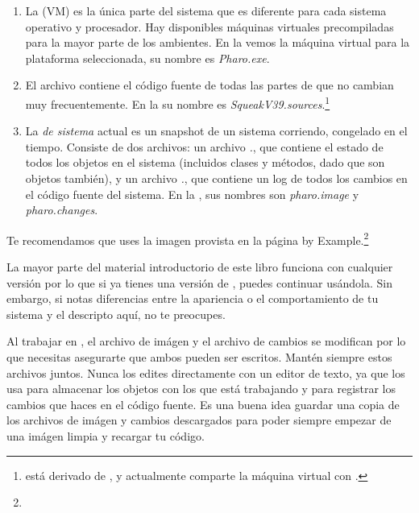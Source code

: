 \documentclass[a4paper,10pt,twoside]{book}
\begin{document}
\begin{enumerate}

  \item La  (VM) es la única parte del sistema que es diferente para cada sistema operativo y procesador. Hay disponibles máquinas virtuales precompiladas para la mayor parte de los ambientes. En la  vemos la máquina virtual para la plataforma seleccionada, su nombre es \textit{Pharo.exe}.

  \item El archivo  contiene el código fuente de todas las partes de \pharo que no cambian muy frecuentemente. En la  su nombre es \emph{SqueakV39.sources}.\footnote{\pharo está derivado de , y actualmente comparte la máquina virtual con \squeak.}

  \item La \emph{ de sistema} actual es un snapshot de un sistema \pharo corriendo, congelado en el tiempo. Consiste de dos archivos: un archivo  \emph{.}, que contiene el estado de todos los objetos en el sistema (incluidos clases y métodos, dado que son objetos también), y un archivo \emph{.}, que contiene un log de todos los cambios en el código fuente del sistema.
En la , sus nombres son \emph{pharo.image} y \emph{pharo.changes}.
\end{enumerate}

Te recomendamos que uses la imagen provista en la página \pharo by Example.\footnote{\pbe}

La mayor parte del material introductorio de este libro funciona con cualquier versión por lo que si ya tienes una versión de \pharo, puedes continuar usándola.
Sin embargo, si notas diferencias entre la apariencia o el comportamiento de tu sistema y el descripto aquí, no te preocupes.

Al trabajar en \pharo, el archivo de im\'agen y el archivo de cambios se modifican por lo que necesitas asegurarte que ambos pueden ser escritos.
Mant\'en siempre estos archivos juntos.
Nunca los edites directamente con un editor de texto, ya que \pharo los usa para almacenar los objetos con los que est\'a trabajando y para registrar los cambios que haces en el c\'odigo fuente.
Es una buena idea guardar una copia de los archivos de im\'agen y cambios descargados para poder siempre empezar de una im\'agen limpia y recargar tu c\'odigo.
\end{document}
